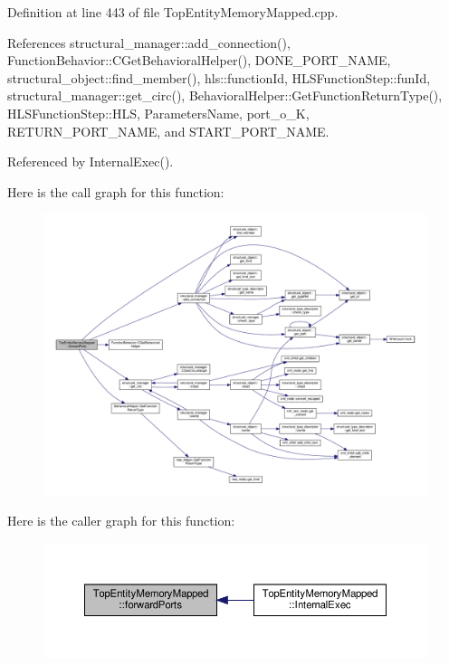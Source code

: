 Definition at line 443 of file Top\+Entity\+Memory\+Mapped.\+cpp.



References structural\+\_\+manager\+::add\+\_\+connection(), Function\+Behavior\+::\+C\+Get\+Behavioral\+Helper(), D\+O\+N\+E\+\_\+\+P\+O\+R\+T\+\_\+\+N\+A\+ME, structural\+\_\+object\+::find\+\_\+member(), hls\+::function\+Id, H\+L\+S\+Function\+Step\+::fun\+Id, structural\+\_\+manager\+::get\+\_\+circ(), Behavioral\+Helper\+::\+Get\+Function\+Return\+Type(), H\+L\+S\+Function\+Step\+::\+H\+LS, Parameters\+Name, port\+\_\+o\+\_\+K, R\+E\+T\+U\+R\+N\+\_\+\+P\+O\+R\+T\+\_\+\+N\+A\+ME, and S\+T\+A\+R\+T\+\_\+\+P\+O\+R\+T\+\_\+\+N\+A\+ME.



Referenced by Internal\+Exec().

Here is the call graph for this function\+:
\nopagebreak
\begin{figure}[H]
\begin{center}
\leavevmode
\includegraphics[width=350pt]{d1/db6/classTopEntityMemoryMapped_acc4023b68af0f08214713a9ec209086d_cgraph}
\end{center}
\end{figure}
Here is the caller graph for this function\+:
\nopagebreak
\begin{figure}[H]
\begin{center}
\leavevmode
\includegraphics[width=350pt]{d1/db6/classTopEntityMemoryMapped_acc4023b68af0f08214713a9ec209086d_icgraph}
\end{center}
\end{figure}
\mbox{\label{classTopEntityMemoryMapped_af010b7c4ce218de33c97dcc351aee6fd}} 
